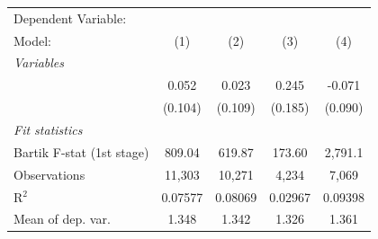 \begin{tabular}{lcccc}
   \tabularnewline \midrule \midrule
   Dependent Variable: & \\
   Model:                                                                & (1)     & (2)     & (3)     & (4)\\  
   \midrule
   \emph{Variables}\\
        & 0.052   & 0.023   & 0.245   & -0.071\\   
                                                                         & (0.104) & (0.109) & (0.185) & (0.090)\\   
   \midrule
   \emph{Fit statistics}\\
   Bartik F-stat (1st stage)                                     & 809.04  & 619.87  & 173.60  & 2,791.1\\  
   Observations                                                          & 11,303  & 10,271  & 4,234   & 7,069\\  
   R$^2$                                                                 & 0.07577 & 0.08069 & 0.02967 & 0.09398\\  
   Mean of dep. var.                                                     & 1.348   & 1.342   & 1.326   & 1.361\\  
\bottomrule
\end{tabular}
